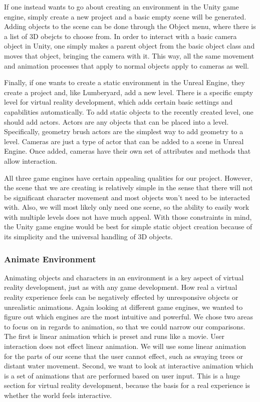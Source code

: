 \documentclass[10pt,journal,compsoc,onecolumn, draftclsnofoot]{IEEEtran}
\begin{document}
If one instead wants to go about creating an environment in the Unity game engine, simply create a new project and a basic empty scene will be generated.
Adding objects to the scene can be done through the Object menu, where there is a list of 3D obejcts to choose from. \cite{unity_getting_started}
In order to interact with a basic camera object in Unity, one simply makes a parent object from the basic object class and moves that object, bringing the camera with it.
This way, all the same movement and animation processes that apply to normal objects apply to cameras as well. \cite{unity_getting_started}

Finally, if one wants to create a static environment in the Unreal Engine, they create a project and, like Lumberyard, add a new level.
There is a specific empty level for virtual reality development, which adds certain basic settings and capabilities automatically. \cite{unreal_editor_manual}
To add static objects to the recently created level, one should add actors.  Actors are any objects that can be placed into a level.
Specifically, geometry brush actors are the simplest way to add geometry to a level. \cite{unreal_editor_manual}
Cameras are just a type of actor that can be added to a scene in Unreal Engine.  Once added, cameras have their own set of attributes and methods that allow interaction.

All three game engines have certain appealing qualities for our project.
However, the scene that we are creating is relatively simple in the sense that there will not be significant character movement and most objects won't need to be interacted with.
Also, we will most likely only need one scene, so the ability to easily work with multiple levels does not have much appeal.
With those constraints in mind, the Unity game engine would be best for simple static object creation because of its simplicity and the universal handling of 3D objects.

\subsubsection{Animate Environment}

Animating objects and characters in an environment is a key aspect of virtual reality development, just as with any game development.
How real a virtual reality experience feels can be negatively effected by unresponsive objects or unrealistic animations.
Again looking at different game engines, we wanted to figure out which engines are the most intuitive and powerful.
We chose two areas to focus on in regards to animation, so that we could narrow our comparisons.
The first is linear animation which is preset and runs like a movie. User interaction does not effect linear animation.
We will use some linear animation for the parts of our scene that the user cannot effect, such as swaying trees or distant water movement.
Second, we want to look at interactive animation which is a set of animations that are performed based on user input.
This is a huge section for virtual reality development, because the basis for a real experience is whether the world feels interactive.
\end{document}
